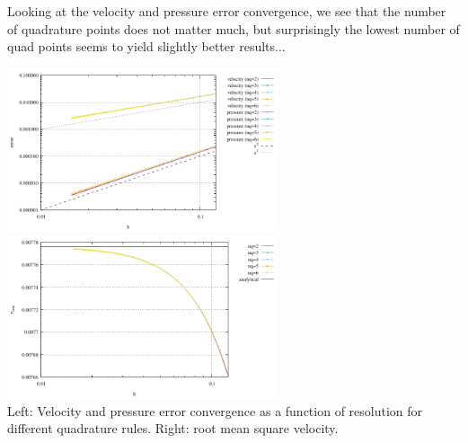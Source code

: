 Looking at the velocity and pressure error convergence, we see that the number of quadrature
points does not matter much, but surprisingly the lowest number of quad points seems to yield slightly
better results...
\begin{center}
\includegraphics[width=8cm]{python_codes/fieldstone_80/results/dh/errors}
\includegraphics[width=8cm]{python_codes/fieldstone_80/results/dh/vrms}\\
{\captionfont Left: Velocity and pressure error convergence as a function of resolution for 
different quadrature rules. Right: root mean square velocity.}
\end{center}

